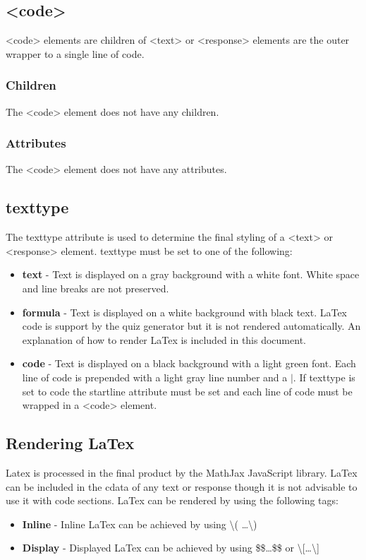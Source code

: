 \documentclass{article}
\begin{document}
	\subsection{{\textless}code{\textgreater}}
	{\textless}code{\textgreater} elements are children of {\textless}text{\textgreater} or {\textless}response{\textgreater} elements are the outer wrapper to a single line of code.
	\subsubsection{Children}
	The {\textless}code{\textgreater} element does not have any children.
	
	\subsubsection{Attributes}
	The {\textless}code{\textgreater} element does not have any attributes.
	
	\subsection{texttype}
	The texttype attribute is used to determine the final styling of a {\textless}text{\textgreater} or {\textless}response{\textgreater} element. texttype must be set to one of the following:
	\begin{itemize}
		\item \textbf{text} - Text is displayed on a gray background with a white font. White space and line breaks are not preserved.
		\item \textbf{formula} - Text is displayed on a white background with black text. LaTex code is support by the quiz generator but it is not rendered automatically. An explanation of how to render LaTex is included in this document.
		\item \textbf{code} - Text is displayed on a black background with a light green font. Each line of code is prepended with a light gray line number and a $\vert$. If texttype is set to code the startline attribute must be set and each line of code must be wrapped in a {\textless}code{\textgreater} element.
	\end{itemize}
	
	\subsection{Rendering LaTex}
	Latex is processed in the final product by the MathJax JavaScript library. LaTex can be included in the cdata of any text or response though it is not advisable to use it with code sections. LaTex can be rendered by using the following tags:
	\begin{itemize}
		\item \textbf{Inline} - Inline LaTex can be achieved by using \textbackslash( \dots \textbackslash)
		\item \textbf{Display} - Displayed LaTex can be achieved by using \$\$\dots\$\$ or \textbackslash[\dots\textbackslash]
	\end{itemize}
	
\end{document}

